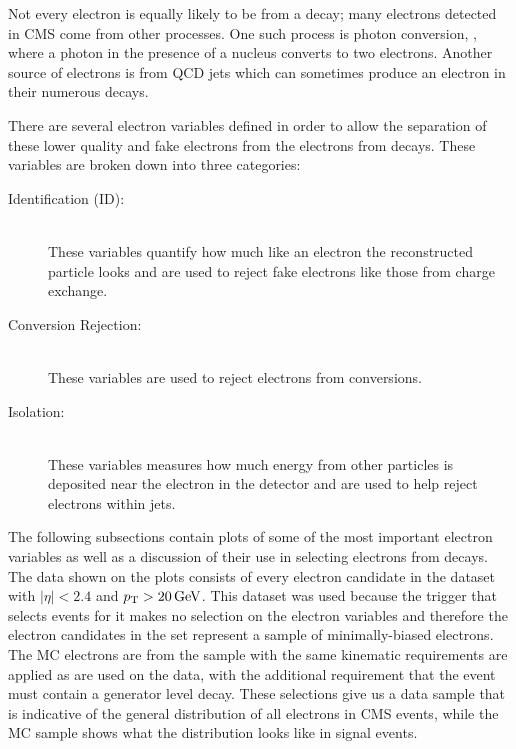 Not every electron is equally likely to be from a \Ztoee decay; many electrons
detected in CMS come from other processes. One such process is photon
conversion, \PhotonConversion, where a photon in the presence of a nucleus
converts to two electrons. Another source of electrons is from QCD jets which
can sometimes produce an electron in their numerous decays.

There are several electron variables defined in order to allow the separation
of these lower quality and fake electrons from the electrons from \Ztoee
decays. These variables are broken down into three categories:

\begin{description}
    \item[Identification (ID):] \hfill \\
        These variables quantify how much like an electron the reconstructed
        particle looks and are used to reject fake electrons like those from
        charge exchange.
    \item[Conversion Rejection:] \hfill \\
        These variables are used to reject electrons from \PhotonConversion
        conversions.
    \item[Isolation:] \hfill \\
        These variables measures how much energy from other particles is
        deposited near the electron in the detector and are used to help reject
        electrons within jets.
\end{description}

The following subsections contain plots of some of the most important electron
variables as well as a discussion of their use in selecting electrons from
\Ztoee decays. The data shown on the plots consists of every electron candidate
in the \SingleMuon dataset with $|\eta| < 2.4$ and $p_{\mathrm{T}} > 20 \,\text{Ge\hspace{-.08em}V}$. This
dataset was used because the trigger that selects events for it makes no
selection on the electron variables and therefore the electron candidates in
the set represent a sample of minimally-biased electrons. The MC electrons are
from the \MADGRAPH \DYtoll sample with the same kinematic requirements are
applied as are used on the data, with the additional requirement that the event
must contain a generator level \Ztoee decay. These selections give us a data
sample that is indicative of the general distribution of all electrons in CMS
events, while the MC sample shows what the distribution looks like in signal
events.

